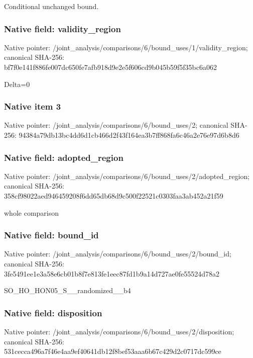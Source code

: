 \documentclass[10pt,a4paper]{article}
\begin{document}
\begingroup\raggedright\sloppy Conditional unchanged bound.\par\endgroup

\subsubsection{Native field: validity\_\allowbreak{}region}
Native pointer: /joint\_\allowbreak{}analysis/comparisons/6/bound\_\allowbreak{}uses/1/validity\_\allowbreak{}region; canonical SHA-256: bf7f0e141f886fe007dc650fe7afb918d9e2e5f606cd9b045b59f5f35bc6a062

\begingroup\raggedright\sloppy Delta=\allowbreak{}0\par\endgroup

\subsubsection{Native item 3}
Native pointer: /joint\_\allowbreak{}analysis/comparisons/6/bound\_\allowbreak{}uses/2; canonical SHA-256: 94384a79db13bc4dd6d1cb466d2f43f164ea3b7ff868fa6c46a2e76e97d6b8d6

\subsubsection{Native field: adopted\_\allowbreak{}region}
Native pointer: /joint\_\allowbreak{}analysis/comparisons/6/bound\_\allowbreak{}uses/2/adopted\_\allowbreak{}region; canonical SHA-256: 358cf98022aed946459208f6dd65db68d9c500f22521c0303faa3ab452a21f59

\begingroup\raggedright\sloppy whole comparison\par\endgroup

\subsubsection{Native field: bound\_\allowbreak{}id}
Native pointer: /joint\_\allowbreak{}analysis/comparisons/6/bound\_\allowbreak{}uses/2/bound\_\allowbreak{}id; canonical SHA-256: 3fe5491ee1e3a58e6cb01b8f7e813fe1eec87fd1b9a14d727ae0fe55524d78a2

\begingroup\raggedright\sloppy SO\_\allowbreak{}HO\_\allowbreak{}HON05\_\allowbreak{}S\_\allowbreak{}\_\allowbreak{}randomized\_\allowbreak{}\_\allowbreak{}b4\par\endgroup

\subsubsection{Native field: disposition}
Native pointer: /joint\_\allowbreak{}analysis/comparisons/6/bound\_\allowbreak{}uses/2/disposition; canonical SHA-256: 531cecca496a7f46e4aa9ef40641db12f8bef53aaa6b67c429d2c0717dc599ce
\end{document}
